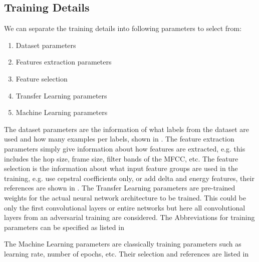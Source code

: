 
\subsection{Training Details}
We can separate the training details into following parameters to select from:
\begin{enumerate}
  \item Dataset parameters
  \item Features extraction parameters
  \item Feature selection
  \item Transfer Learning parameters
  \item Machine Learning parameters
\end{enumerate}
The dataset parameters are the information of what labels from the dataset are used and how many examples per labels, shown in .
The feature extraction parameters simply give information about how features are extracted, e.g. this includes the hop size, frame size, filter bands of the MFCC, etc.
The feature selection is the information about what input feature groups are used in the training, e.g. use cepstral coefficients only, or add delta and energy features, their references are shown in .
The Transfer Learning parameters are pre-trained weights for the actual neural network architecture to be trained.
This could be only the first convolutional layers or entire networks but here all convolutional layers from an adversarial training are considered. 
The Abbreviations for training parameters can be specified as listed in 


The Machine Learning parameters are classically training parameters such as learning rate, number of epochs, etc.
Their selection and references are listed in 



